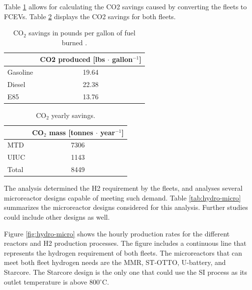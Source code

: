 Table \ref{tab:co2-eq} allows for calculating the \gls{CO2} savings caused by converting the fleets to \glspl{FCEV}.
Table \ref{tab:co2} displays the \gls{CO2} savings for both fleets.

	\begin{table}[htbp!]
		\centering
	    \caption{CO$_2$ savings in pounds per gallon of fuel burned \cite{energy_information_administration_how_2014}.}
		\begin{tabular}{lc}
		\toprule
		              & \gls{CO2} produced [lbs $\cdot$ gallon$^{-1}$] \\
        \midrule
		Gasoline      & 19.64           \\
		Diesel        & 22.38           \\
		E85           & 13.76           \\
		\bottomrule
        \end{tabular}
        \label{tab:co2-eq}
	\end{table}

	\begin{table}[htbp!]
		\centering
	    \caption{CO$_2$ yearly savings.}
		\begin{tabular}{lc}
		\toprule
		            & CO$_2$ mass [tonnes $\cdot$ year$^{-1}$] \\
		\midrule
		MTD      	& 7306           \\
		UIUC        & 1143           \\
		Total       & 8449           \\
		\bottomrule
        \end{tabular}
        \label{tab:co2}
	\end{table}

The analysis determined the \gls{H2} requirement by the fleets, and analyses several microreactor designs capable of meeting such demand.
Table \ref{tab:hydro-micro} summarizes the microreactor designs considered for this analysis.
Further studies could include other designs as well.

Figure \ref{fig:hydro-micro} shows the hourly production rates for the different reactors and \gls{H2} production processes.
The figure includes a continuous line that represents the hydrogen requirement of both fleets.
The microreactors that can meet both fleet hydrogen needs are the MMR, ST-OTTO, U-battery, and Starcore.
The Starcore design is the only one that could use the \gls{SI} process as its outlet temperature is above 800$^{\circ}$C.


